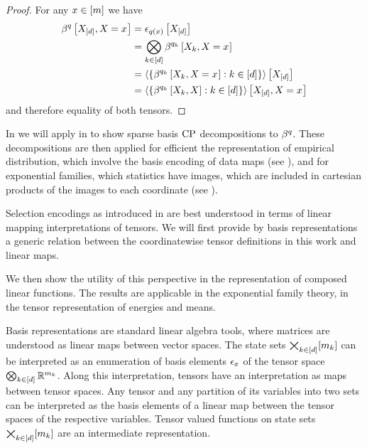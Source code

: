 \begin{proof}
    For any $x\in[m]$ we have
    \begin{align*}
        \beta^{q}\left[X_{[d]},X_{}=x_{}\right]
        &= \epsilon_{q(x)}\left[X_{[d]}\right] \\
        &= \bigotimes_{k\in[d]} \beta^{q_{k}}\left[X_{k},X_{}=x_{}\right] \\
        &= \left\langle 
            \{\beta^{q_{k}}\left[X_{k},X_{}=x_{}\right] : k\in[d]\}
        \right\rangle \left[ X_{[d]} \right] \\
        &= \left\langle 
            \{\beta^{q_{k}}\left[X_{k},X\right] : k\in[d]\}
        \right\rangle \left[ X_{[d]},X_{}=x_{} \right]
    \end{align*}
    and therefore equality of both tensors.
\end{proof}

In  we will apply  in  to show sparse basis $\mathrm{CP}$ decompositions to $\beta^{q}$.
These decompositions are then applied for efficient the representation of empirical distribution, which involve the basis encoding of data maps (see ), and for exponential families, which statistics have images, which are included in cartesian products of the images to each coordinate (see ).




Selection encodings as introduced in  are best understood in terms of linear mapping interpretations of tensors.
We will first provide by basis representations a generic relation between the coordinatewise tensor definitions in this work and linear maps.

We then show the utility of this perspective in the representation of composed linear functions.
The results are applicable in the exponential family theory, in the tensor representation of energies and means.


Basis representations are standard linear algebra tools, where matrices are understood as linear maps between vector spaces.
The state sets $\bigtimes_{k\in[d]}[m_{k}]$ can be interpreted as an enumeration of basis elements $\epsilon_{x}$ of the tensor space $\bigotimes_{k\in[d]} \mathbb{R}^{m_{k}}$.
Along this interpretation, tensors have an interpretation as maps between tensor spaces.
Any tensor and any partition of its variables into two sets can be interpreted as the basis elements of a linear map between the tensor spaces of the respective variables.
Tensor valued functions on state sets $\bigtimes_{k\in[d]}[m_{k}]$ are an intermediate representation.

